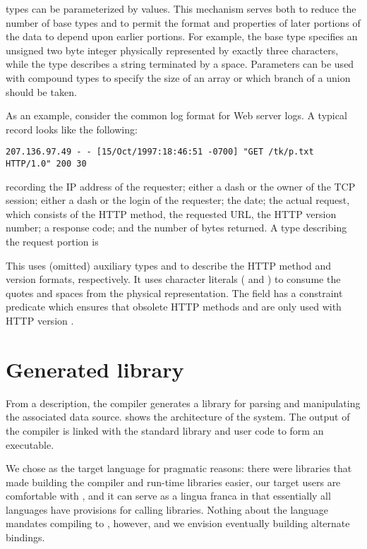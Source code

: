 \pads{} types can be parameterized by values.
This mechanism
serves both to reduce the number of base types and to permit the
format and properties of later portions of the data to depend upon earlier portions.
For example, 
the base type  specifies an unsigned two byte integer
physically represented by exactly three characters, while the type
describes a string terminated by a space.  Parameters can be 
used with compound types to specify the size of an array or which
branch of a union should be taken.


As an example, consider the common log format for Web server logs.  A
typical record looks like the following:
\begin{verbatim}
207.136.97.49 - - [15/Oct/1997:18:46:51 -0700] "GET /tk/p.txt HTTP/1.0" 200 30
\end{verbatim}

\noindent
recording the IP address of the requester; either a dash or the owner
of the TCP session; either a dash or the login of the requester; the
date; the actual request, which consists of the HTTP method, the
requested URL, the HTTP version number; a response code; and the
number of bytes returned.  A \PADSL{} type describing the request
portion is

This \pstruct{} uses (omitted) auxiliary types  and
 to describe
the HTTP method and version formats, respectively.
It uses character literals ( and ) to consume
the quotes and 
spaces from the physical representation. 
The  field has a constraint predicate 
which ensures that obsolete HTTP methods  and  
are only used with HTTP version .

\section{Generated library}

From a description, the \pads{} compiler generates a \C{} library
for parsing and manipulating the associated data source.  
 shows the architecture of the \pads{}
system.  The output of the \pads{} compiler is linked with the \pads{}
standard library and user code to form an executable.

We chose \C{} as the target language for pragmatic reasons: there were
libraries that made building the compiler and run-time libraries
easier, our target users are comfortable with \C{}, and it can serve
as a lingua franca in that essentially all languages have provisions
for calling \C{} libraries.  Nothing about the \pads{} language
mandates compiling to \C{}, however, and we envision eventually
building alternate bindings.

